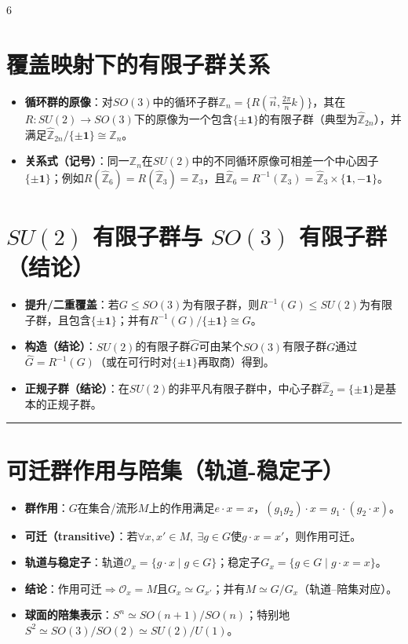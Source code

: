 \documentclass[landscape]{article}
\begin{document}
\begin{multicols*}{6}
\section*{覆盖映射下的有限子群关系}
\begin{itemize}
  \item \textbf{循环群的原像}：对$SO(3)$中的循环子群$\mathbb{Z}_n=\{R(\vec n,\tfrac{2\pi}{n}k)\}$，其在$R:SU(2)\to SO(3)$下的原像为一个包含$\{\pm\mathbf{1}\}$的有限子群（典型为$\widehat{\mathbb{Z}}_{2n}$），并满足$\widehat{\mathbb{Z}}_{2n}/\{\pm\mathbf{1}\}\cong \mathbb{Z}_n$。
  \item \textbf{关系式（记号）}：同一$\mathbb{Z}_n$在$SU(2)$中的不同循环原像可相差一个中心因子$\{\pm\mathbf{1}\}$；例如$R(\widehat{\mathbb{Z}}_{6})=R(\widehat{\mathbb{Z}}_{3})=\mathbb{Z}_3$，且$\widehat{\mathbb{Z}}_{6}=R^{-1}(\mathbb{Z}_3)=\widehat{\mathbb{Z}}_{3}\times\{\mathbf{1},-\mathbf{1}\}$。
\end{itemize}

\section*{$SU(2)$ 有限子群与 $SO(3)$ 有限子群（结论）}
\begin{itemize}
  \item \textbf{提升/二重覆盖}：若$G\le SO(3)$为有限子群，则$R^{-1}(G)\le SU(2)$为有限子群，且包含$\{\pm\mathbf{1}\}$；并有$R^{-1}(G)/\{\pm\mathbf{1}\}\cong G$。
  \item \textbf{构造（结论）}：$SU(2)$的有限子群$\widehat G$可由某个$SO(3)$有限子群$G$通过$\widehat G=R^{-1}(G)$（或在可行时对$\{\pm\mathbf{1}\}$再取商）得到。
  \item \textbf{正规子群（结论）}：在$SU(2)$的非平凡有限子群中，中心子群$\widehat{\mathbb{Z}}_2=\{\pm\mathbf{1}\}$是基本的正规子群。
\end{itemize}
\noindent\textcolor{blue}{\rule{\linewidth}{1pt}}
\section*{可迁群作用与陪集（轨道-稳定子）}
\begin{itemize}
  \item \textbf{群作用}：$G$在集合/流形$M$上的作用满足$e\cdot x=x$，$(g_1g_2)\cdot x=g_1\cdot(g_2\cdot x)$。
  \item \textbf{可迁（transitive）}：若$\forall x,x'\in M,\ \exists g\in G$使$g\cdot x=x'$，则作用可迁。
  \item \textbf{轨道与稳定子}：轨道$\mathcal O_x=\{g\cdot x\mid g\in G\}$；稳定子$G_x=\{g\in G\mid g\cdot x=x\}$。
  \item \textbf{结论}：作用可迁$\Rightarrow \mathcal O_x=M$且$G_x\simeq G_{x'}$；并有$M\simeq G/G_x$（轨道--陪集对应）。
  \item \textbf{球面的陪集表示}：$S^{n}\simeq SO(n{+}1)/SO(n)$；特别地$S^{2}\simeq SO(3)/SO(2)\simeq SU(2)/U(1)$。
\end{itemize}

\end{multicols*}
\end{document}
